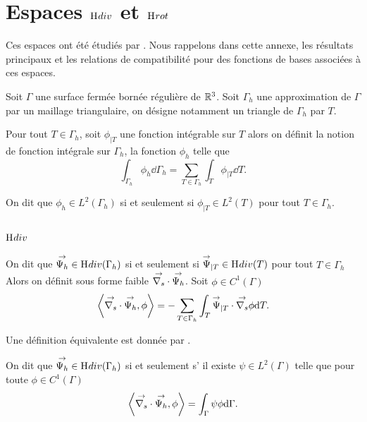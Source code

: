 \section[Espaces Hdiv et Hrot]{Espaces \(\mathrm{H}_\mathrm{{}}{div}\) et \(\mathrm{H}_\mathrm{{}}{rot}\)}

Ces espaces ont été étudiés par \cite{nedelec_mixed_1980}. Nous rappelons dans cette annexe, les résultats principaux et les relations de compatibilité pour des fonctions de bases associées à ces espaces.

Soit \(\Gamma\) une surface fermée bornée régulière de \(\mathbb R^3\).
Soit \(\Gamma_h\) une approximation de \(\Gamma\) par un maillage triangulaire, on désigne notamment un triangle de \(\Gamma_h\) par \(T\).

\begin{defn}
    Pour tout \(T \in \Gamma_h\), soit \(\phi_{|T}\) une fonction intégrable sur \(T\) alors
    on définit la notion de fonction intégrale sur \(\Gamma_h\), la fonction \(\phi_h\) telle que
    \begin{equation*}
        \int_{\Gamma_h} \phi_h \dd{\Gamma_h} = \sum_{T\in\Gamma_h} \int_T \phi_{|T} \dd{T}.
    \end{equation*}
\end{defn}

\begin{defn}
    On dit que \(\phi_h \in L^2(\Gamma_h)\) si et seulement si \(\phi_{|T} \in L^2(T)\) pour tout \(T \in \Gamma_h\).
\end{defn}

\subsection[Hdiv]{\(\mathrm{H}_\mathrm{{}}{div}\)}

\begin{defn}
    On dit que \({\overset{\rightarrow}{\Psi_h}} \in \mathrm{H}_\mathrm{{}}{div}(\Gamma_h)\) si et seulement si \({\overset{\rightarrow}{\Psi}}_{|T} \in \mathrm{H}_\mathrm{{}}{div}(T)\) pour tout \(T \in \Gamma_h\)
    Alors on définit sous forme faible \({\overset{\rightarrow}{\nabla_s}} \cdot {\overset{\rightarrow}{\Psi_h}} \).
    Soit \(\phi \in C^1(\Gamma)\)
    \begin{equation*}
        \left< \vdivs \vect{\Psi_h}, \phi \right> %
        = - \sum_{T\in\Gamma_h} \int_T \vect{\Psi}_{|T} \cdot \vgrads \phi\dd{T}.
    \end{equation*}
\end{defn}

Une définition équivalente est donnée par \cite[eq.~5.3]{bendali_equations_2014}.
\begin{defn}
    On dit que \({\overset{\rightarrow}{\Psi_h}} \in \mathrm{H}_\mathrm{{}}{div}(\Gamma_h)\) si et seulement s’ il existe \(\psi\in L^2(\Gamma)\) telle que pour toute \(\phi \in C^1(\Gamma)\)
    \begin{equation*}
        \left< {\overset{\rightarrow}{\nabla_s}} \cdot {\overset{\rightarrow}{\Psi_h}}, \phi \right> = \int_\Gamma \psi \phi \mathrm{d}{\Gamma}.
    \end{equation*}
\end{defn}

